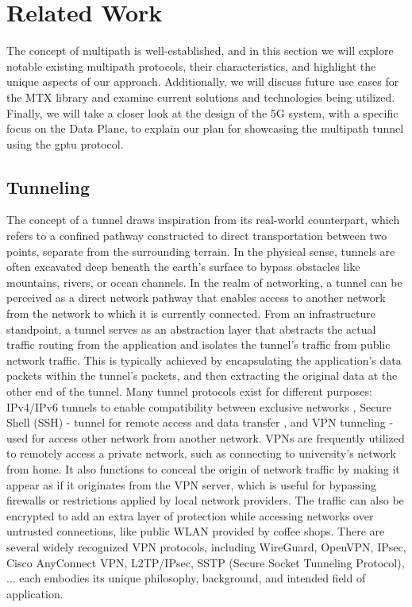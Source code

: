 \cleardoublepage\chapter{Related Work}\label{sec:related_work}\minitoc\vspace{.5cm}

The concept of multipath is well-established, and in this section we will explore notable existing multipath protocols, their characteristics, and highlight the unique aspects of our approach. 
Additionally, we will discuss future use cases for the \ac{MTX} library and examine current solutions and technologies being utilized. 
Finally, we will take a closer look at the design of the 5G system, with a specific focus on the Data Plane, to explain our plan for showcasing the multipath tunnel using the \ac{gptu} protocol.

\section{Tunneling}
The concept of a tunnel draws inspiration from its real-world counterpart, which refers to a confined pathway constructed to direct transportation between two points, separate from the surrounding terrain. 
In the physical sense, tunnels are often excavated deep beneath the earth's surface to bypass obstacles like mountains, rivers, or ocean channels.
In the realm of networking, a tunnel can be perceived as a direct network pathway that enables access to another network from the network to which it is currently connected. 
From an infrastructure standpoint, a tunnel serves as an abstraction layer that abstracts the actual traffic routing from the application and isolates the tunnel's traffic from public network traffic. 
This is typically achieved by encapsulating the application's data packets within the tunnel's packets, and then extracting the original data at the other end of the tunnel.
Many tunnel protocols exist for different purposes: IPv4/IPv6 tunnels to enable compatibility between exclusive networks \cite{rfc4380_Teredo_ipv6_tunnel_udp}, Secure Shell (SSH) - tunnel for remote access and data transfer \cite{rfc4251_ssh_protocol}, and \ac{VPN} tunneling - used for access other network from another network. 
\ac{VPN}s are frequently utilized to remotely access a private network, such as connecting to university's network from home. 
It also functions to conceal the origin of network traffic by making it appear as if it originates from the VPN server, which is useful for bypassing firewalls or restrictions applied by local network providers.
The traffic can also be encrypted to add an extra layer of protection while accessing networks over untrusted connections, like public WLAN provided by coffee shops.
There are several widely recognized VPN protocols, including WireGuard, OpenVPN, IPsec, Cisco AnyConnect VPN, L2TP/IPsec, SSTP (Secure Socket Tunneling Protocol), ... each embodies its unique philosophy, background, and intended field of application.


